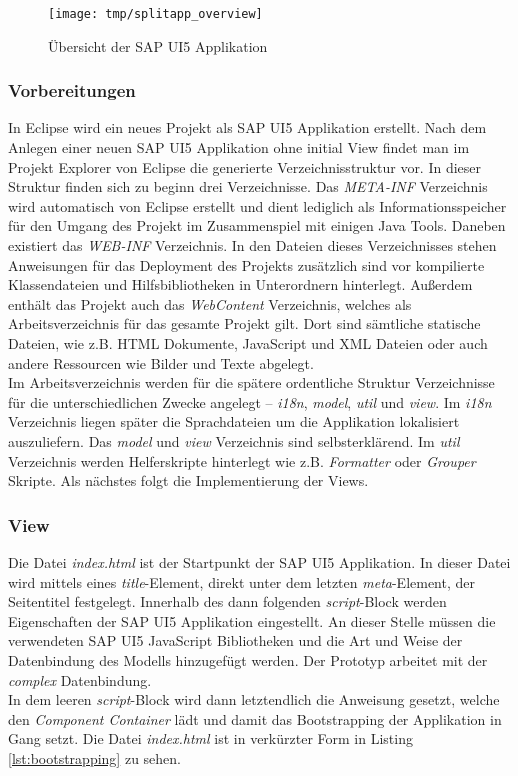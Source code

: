 \vspace{1em}
\begin{figure}[htb]
  \centering
  \texttt{[image: tmp/splitapp\_overview]}
  \caption[Übersicht der SAP UI5 Applikation]{Übersicht der SAP UI5 Applikation \cite{SAPSplitApp}}
  \label{fig:splitappoverview}
\end{figure}

\subsubsection{Vorbereitungen}
In Eclipse wird ein neues Projekt als SAP UI5 Applikation erstellt. Nach dem Anlegen einer neuen SAP UI5 Applikation ohne initial View findet man im Projekt Explorer von Eclipse die generierte Verzeichnisstruktur vor. In dieser Struktur finden sich zu beginn drei Verzeichnisse. Das \textit{META-INF} Verzeichnis wird automatisch von Eclipse erstellt und dient lediglich als Informationsspeicher für den Umgang des Projekt im Zusammenspiel mit einigen Java Tools. Daneben existiert das \textit{WEB-INF} Verzeichnis. In den Dateien dieses Verzeichnisses stehen Anweisungen für das Deployment des Projekts zusätzlich sind vor kompilierte Klassendateien und Hilfsbibliotheken in Unterordnern hinterlegt. Außerdem enthält das Projekt auch das \textit{WebContent} Verzeichnis, welches als Arbeitsverzeichnis für das gesamte Projekt gilt. Dort sind sämtliche statische Dateien, wie z.B. HTML Dokumente, JavaScript und XML Dateien oder auch andere Ressourcen wie Bilder und Texte abgelegt.\\Im Arbeitsverzeichnis werden für die spätere ordentliche Struktur Verzeichnisse für die unterschiedlichen Zwecke angelegt -- \textit{i18n}, \textit{model}, \textit{util} und \textit{view}. Im \textit{i18n} Verzeichnis liegen später die Sprachdateien um die Applikation lokalisiert auszuliefern. Das \textit{model} und \textit{view} Verzeichnis sind selbsterklärend. Im \textit{util} Verzeichnis werden Helferskripte hinterlegt wie z.B. \textit{Formatter} oder \textit{Grouper} Skripte. Als nächstes folgt die Implementierung der Views.

\subsubsection{View}
Die Datei \textit{index.html} ist der Startpunkt der SAP UI5 Applikation. In dieser Datei wird mittels eines \textit{title}-Element, direkt unter dem letzten \textit{meta}-Element, der Seitentitel festgelegt. Innerhalb des dann folgenden \textit{script}-Block werden Eigenschaften der SAP UI5 Applikation eingestellt. An dieser Stelle müssen die verwendeten SAP UI5 JavaScript Bibliotheken und die Art und Weise der Datenbindung des Modells hinzugefügt werden. Der Prototyp arbeitet mit der \textit{complex} Datenbindung.\\In dem leeren \textit{script}-Block wird dann letztendlich die Anweisung gesetzt, welche den \textit{Component Container} lädt und damit das Bootstrapping der Applikation in Gang setzt. Die Datei \textit{index.html} ist in verkürzter Form in Listing \ref{lst:bootstrapping} zu sehen.
	
